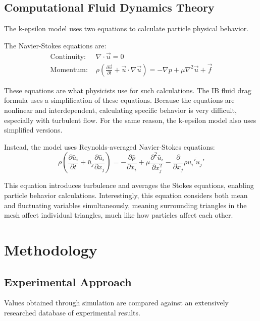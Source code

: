 \documentclass[12pt,a4paper]{article}
\begin{document}
\subsection{Computational Fluid Dynamics Theory}

The k-epsilon model uses two equations to calculate particle physical behavior.

The Navier-Stokes equations are:
\begin{align}
\text{Continuity: } &\nabla \cdot \vec{u} = 0\\
\text{Momentum: } &\rho\left(\frac{\partial\vec{u}}{\partial t} + \vec{u} \cdot \nabla\vec{u}\right) = -\nabla p + \mu\nabla^2\vec{u} + \vec{f}
\end{align}

These equations are what physicists use for such calculations. The IB fluid drag formula uses a simplification of these equations. Because the equations are nonlinear and interdependent, calculating specific behavior is very difficult, especially with turbulent flow. For the same reason, the k-epsilon model also uses simplified versions.

Instead, the model uses Reynolds-averaged Navier-Stokes equations:
\begin{equation}
\rho\left(\frac{\partial\bar{u}_i}{\partial t} + \bar{u}_j\frac{\partial\bar{u}_i}{\partial x_j}\right) = -\frac{\partial\bar{p}}{\partial x_i} + \mu\frac{\partial^2\bar{u}_i}{\partial x_j^2} - \frac{\partial}{\partial x_j}\rho\overline{u_i'u_j'}
\end{equation}

This equation introduces turbulence and averages the Stokes equations, enabling particle behavior calculations. Interestingly, this equation considers both mean and fluctuating variables simultaneously, meaning surrounding triangles in the mesh affect individual triangles, much like how particles affect each other.

\section{Methodology}

\subsection{Experimental Approach}

Values obtained through simulation are compared against an extensively researched database of experimental results.
\end{document}
